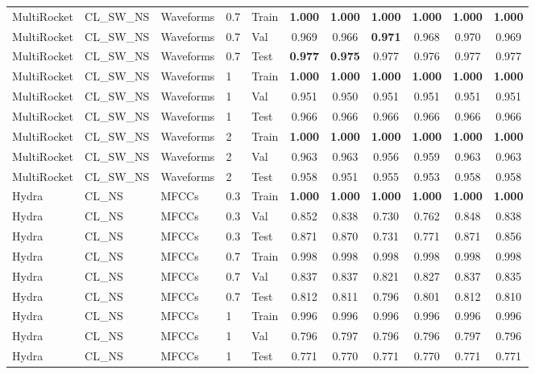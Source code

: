 \begin{landscape}
\begin{longtable}{|l|l|l|l|l|c|c|c|c|c|c|}
MultiRocket & CL\_SW\_NS & Waveforms & 0.7 & Train & \textbf{1.000} & \textbf{1.000} & \textbf{1.000} & \textbf{1.000} & \textbf{1.000} & \textbf{1.000} \\
MultiRocket & CL\_SW\_NS & Waveforms & 0.7 & Val & 0.969 & 0.966 & \textbf{0.971} & 0.968 & 0.970 & 0.969 \\
MultiRocket & CL\_SW\_NS & Waveforms & 0.7 & Test & \textbf{0.977} & \textbf{0.975} & 0.977 & 0.976 & 0.977 & 0.977 \\
MultiRocket & CL\_SW\_NS & Waveforms & 1 & Train & \textbf{1.000} & \textbf{1.000} & \textbf{1.000} & \textbf{1.000} & \textbf{1.000} & \textbf{1.000} \\
MultiRocket & CL\_SW\_NS & Waveforms & 1 & Val & 0.951 & 0.950 & 0.951 & 0.951 & 0.951 & 0.951 \\
MultiRocket & CL\_SW\_NS & Waveforms & 1 & Test & 0.966 & 0.966 & 0.966 & 0.966 & 0.966 & 0.966 \\
MultiRocket & CL\_SW\_NS & Waveforms & 2 & Train & \textbf{1.000} & \textbf{1.000} & \textbf{1.000} & \textbf{1.000} & \textbf{1.000} & \textbf{1.000} \\
MultiRocket & CL\_SW\_NS & Waveforms & 2 & Val & 0.963 & 0.963 & 0.956 & 0.959 & 0.963 & 0.963 \\
MultiRocket & CL\_SW\_NS & Waveforms & 2 & Test & 0.958 & 0.951 & 0.955 & 0.953 & 0.958 & 0.958 \\
Hydra & CL\_NS & MFCCs & 0.3 & Train & \textbf{1.000} & \textbf{1.000} & \textbf{1.000} & \textbf{1.000} & \textbf{1.000} & \textbf{1.000} \\
Hydra & CL\_NS & MFCCs & 0.3 & Val & 0.852 & 0.838 & 0.730 & 0.762 & 0.848 & 0.838 \\
Hydra & CL\_NS & MFCCs & 0.3 & Test & 0.871 & 0.870 & 0.731 & 0.771 & 0.871 & 0.856 \\
Hydra & CL\_NS & MFCCs & 0.7 & Train & 0.998 & 0.998 & 0.998 & 0.998 & 0.998 & 0.998 \\
Hydra & CL\_NS & MFCCs & 0.7 & Val & 0.837 & 0.837 & 0.821 & 0.827 & 0.837 & 0.835 \\
Hydra & CL\_NS & MFCCs & 0.7 & Test & 0.812 & 0.811 & 0.796 & 0.801 & 0.812 & 0.810 \\
Hydra & CL\_NS & MFCCs & 1 & Train & 0.996 & 0.996 & 0.996 & 0.996 & 0.996 & 0.996 \\
Hydra & CL\_NS & MFCCs & 1 & Val & 0.796 & 0.797 & 0.796 & 0.796 & 0.797 & 0.796 \\
Hydra & CL\_NS & MFCCs & 1 & Test & 0.771 & 0.770 & 0.771 & 0.770 & 0.771 & 0.771 \\

\end{longtable}
\end{landscape}
